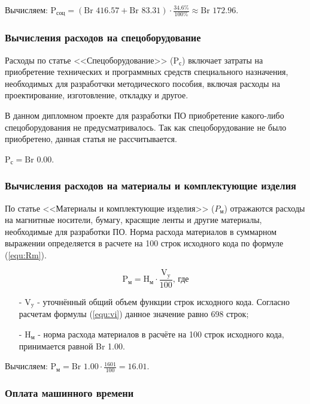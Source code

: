 Вычисляем: $\text{P}_\text{соц} = (\text{Br }416.57 + \text{Br }83.31) \cdot \frac{ 34.6\% }{ 100\% } \approx \text{Br }172.96$.

\subsubsection*{Вычисления расходов на спецоборудование}

Расходы по статье <<Спецоборудование>> ($\text{P}_\text{с}$) включает затраты на приобретение технических и программных средств специального назначения,
необходимых для разработчки методического пособия, включая расходы на проектирование, изготовление, откладку и другое.

В данном дипломном проекте для разработки ПО приобретение какого-либо спецоборудования не предусматривалось.
Так как спецоборудование не было приобретено, данная статья не рассчитывается.

$\text{P}_\text{с} = \text{Br }0.00$.

\subsubsection*{Вычисления расходов на материалы и комплектующие изделия}

По статье <<Материалы и комплектующие изделия>> ($P_\text{м}$) отражаются расходы на магнитные носители, бумагу, красящие ленты и другие материалы,
необходимые для разработки ПО.
Норма расхода материалов в суммарном выражении определяется в расчете на 100 строк исходного кода по формуле (\ref{equ:Rm}).

\begin{equation}
    \label{equ:Rm}
    \text{P}_\text{м} = \text{H}_\text{м} \cdot \frac{ \text{V}_\text{y} }{ 100 } \text{, где}
\end{equation}

\begin{enumerate}
    \item[-] $\text{V}_\text{y}$ - уточнённый общий объем функции строк исходного кода.
    Согласно расчетам формулы (\ref{equ:vi}) данное значение равно 698 строк;
    \item[-] $\text{H}_\text{м}$ - норма расхода материалов в расчёте на 100 строк исходного кода, принимается равной Br 1.00.
\end{enumerate}

Вычисляем: $\text{P}_\text{м} = \text{Br } 1.00 \cdot \frac{ 1601 }{ 100 } = 16.01$.

\subsubsection*{Оплата машинного времени}

